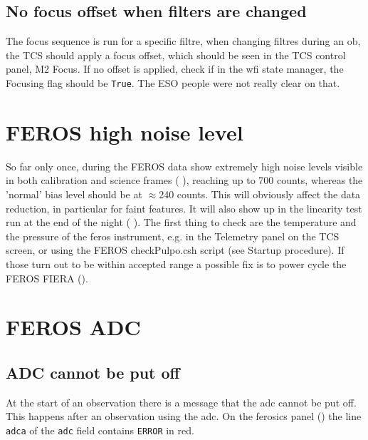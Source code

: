 \documentclass[11pt,fleqn,a4paper]{book}
\begin{document}
\subsection{No focus offset when filters are changed}
\label{sec:filfocoffset}
The \gls{focus} sequence is run for a specific filtre, when changing filtres during an \gls{ob}, the TCS should apply a focus offset, which should be seen in the \gls{TCS control panel}, M2 Focus. If no offset is applied, check if in the \gls{wfi} \gls{state manager}, the Focusing flag should be \texttt{True}. The ESO people were not really clear on that.


\section{FEROS high noise level}

So far only once, during the FEROS data show extremely high noise levels visible in both calibration and science frames ( ),  reaching up to 700 counts, whereas the 'normal' bias level should be at $\approx$240 counts. This will obviously affect the data reduction, in particular  for faint features. It will also show up in the linearity test run at the end of the night ( ). The first thing to check are the temperature and the pressure of the \gls{feros} instrument, e.g. in the Telemetry panel on the TCS screen, or using the FEROS checkPulpo.csh script (see Startup procedure). If those turn out to be within accepted range a possible fix is to power cycle the FEROS FIERA (). 



\section{FEROS ADC}
\subsection{ADC cannot be put off}

At the start of an observation there is a message that the \gls{adc} cannot be
put off.  This happens after an observation using the \gls{adc}.  On the 
\gls{ferosics} panel () the line \texttt{adca} of the
\texttt{adc} field contains \texttt{ERROR} in red.  
\end{document}
